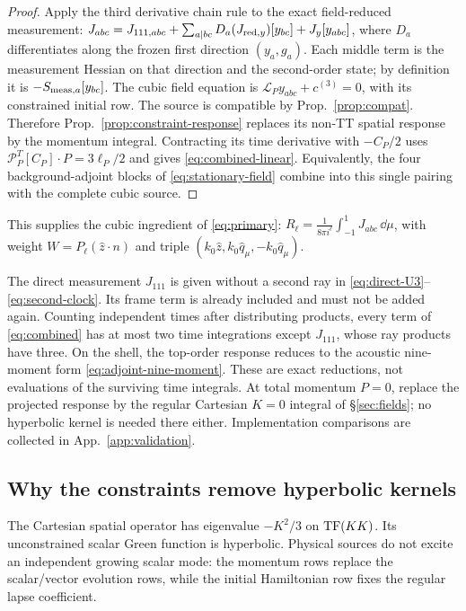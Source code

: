 \begin{proof}
Apply the third derivative chain rule to the exact field-reduced measurement:
$J_{abc}=J_{111,abc}+\sum_{a|bc}D_a(J_{{\rm red},y})[y_{bc}]+J_y[y_{abc}]$,
where $D_a$ differentiates along the frozen first direction $(y_a,g_a)$.
Each middle term is the measurement Hessian on that direction and the second-order
state; by definition it is $-S_{{\rm meas},a}[y_{bc}]$.
The cubic field equation is
$\mathcal L_Py_{abc}+c^{(3)}=0$, with its constrained initial row.
The source is compatible by Prop.~\ref{prop:compat}. Therefore
Prop.~\ref{prop:constraint-response} replaces its non-TT spatial response by the
momentum integral. Contracting its time derivative with $-C_P/2$ uses
$\mathcal P_P^T[C_P]\cdot P=3\ell_P/2$ and gives \eqref{eq:combined-linear}.
Equivalently, the four background-adjoint blocks of \eqref{eq:stationary-field}
combine into this single pairing with the complete cubic source.
\end{proof}

This supplies the cubic ingredient of \eqref{eq:primary}:
$R_\ell=\frac1{8\pi i^\ell}\int_{-1}^1J_{abc}\,\dd\mu$, with weight $W=P_\ell(\hat z\cdot n)$ and
triple $(k_0\hat z,k_0\hat q_\mu,-k_0\hat q_\mu)$.

The direct measurement $J_{111}$ is given without a second ray in
\eqref{eq:direct-U3}--\eqref{eq:second-clock}. Its frame term is already included and must
not be added again. Counting independent times after distributing products, every term of
\eqref{eq:combined} has at most two time integrations except $J_{111}$, whose ray products
have three. On the shell, the top-order response reduces to the acoustic nine-moment
form \eqref{eq:adjoint-nine-moment}. These are exact reductions, not evaluations of the
surviving time integrals. At total momentum $P=0$, replace the projected response by the
regular Cartesian $K=0$ integral of \S\ref{sec:fields}; no hyperbolic kernel is needed there
either. Implementation comparisons are collected in App.~\ref{app:validation}.

\subsection{Why the constraints remove hyperbolic kernels}\label{sec:constraint-rows}
The Cartesian spatial operator has eigenvalue $-K^2/3$ on $\operatorname{TF}(KK)$.
Its unconstrained scalar Green function is hyperbolic. Physical sources do not excite an
independent growing scalar mode: the momentum rows replace the scalar/vector evolution
rows, while the initial Hamiltonian row fixes the regular lapse coefficient.

